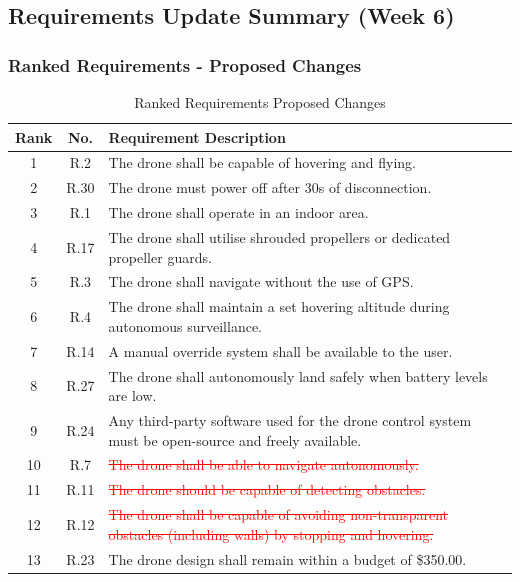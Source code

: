 \pagebreak

\subsection{Requirements Update Summary (Week 6)}
\label{app:req-changes}

\subsubsection{Ranked Requirements - Proposed Changes}

\begin{table}[H]
\centering
\caption{Ranked Requirements Proposed Changes}
\begin{tabular}{|c|c|p{11cm}|}
\hline
\textbf{Rank} & \textbf{No.} & \textbf{Requirement Description} \\ \hline
1 & R.2 & The drone shall be capable of hovering and flying. \\ \hline
2 & R.30 & The drone must power off after 30s of disconnection. \\ \hline
3 & R.1 & The drone shall operate in an indoor area. \\ \hline
4 & R.17 & The drone shall utilise shrouded propellers or dedicated propeller guards. \\ \hline
5 & R.3 & The drone shall navigate without the use of GPS. \\ \hline
6 & R.4 & The drone shall maintain a set hovering altitude during autonomous surveillance. \\ \hline
7 & R.14 & A manual override system shall be available to the user. \\ \hline
8 & R.27 & The drone shall autonomously land safely when battery levels are low. \\ \hline
9 & R.24 & Any third-party software used for the drone control system must be open-source and freely available. \\ \hline
10 & R.7 & \textcolor{red}{\sout{The drone shall be able to navigate autonomously.}} \\ \hline
11 & R.11 & \textcolor{red}{\sout{The drone should be capable of detecting obstacles.}} \\ \hline
12 & R.12 & \textcolor{red}{\sout{The drone shall be capable of avoiding non-transparent obstacles (including walls) by stopping and hovering.}} \\ \hline
13 & R.23 & The drone design shall remain within a budget of \$350.00. \\ \hline

\end{tabular}
\end{table}
